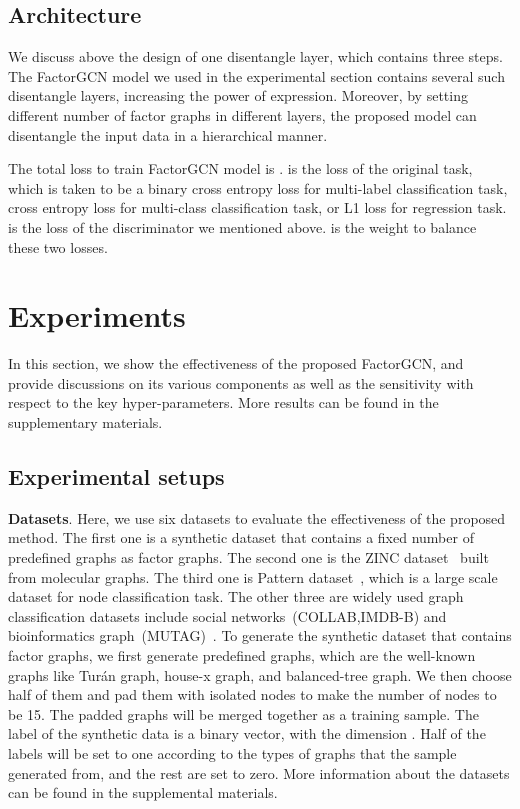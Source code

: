 \documentclass{article}
\begin{document}
\subsection{Architecture}

We discuss above the design of one disentangle layer, 
which contains three steps. The FactorGCN model 
we used in the experimental section contains
several such disentangle layers, increasing
the power of expression. Moreover, by setting different
number of factor graphs in different layers, 
the proposed model can disentangle the input data
in a hierarchical manner.

The total loss to train FactorGCN model is .  is the loss of
the original task, which is taken to be 
a binary cross entropy loss for multi-label
classification task, cross entropy loss for
multi-class classification task, or L1 loss for regression task.
 is the loss 
of the discriminator we mentioned above.  is the 
weight to balance these two losses.

\section{Experiments}

In this section, 
we show the effectiveness of the proposed FactorGCN,
and provide discussions
on its various components as well as 
the sensitivity with respect to the
key hyper-parameters.
More results can be found in the supplementary materials. 

\subsection{Experimental setups}

{\textbf{Datasets}. }
Here, we use six datasets to evaluate the 
effectiveness of the proposed method.
The first one is a synthetic dataset 
that contains a fixed number of predefined graphs
as factor graphs. The second one is the ZINC dataset~\citep{dwivedi2020benchmarkinggnn} 
built from molecular graphs.
The third one is Pattern dataset~\citep{dwivedi2020benchmarkinggnn},
which is a large scale dataset for node classification task.
The other three are widely used graph classification datasets
include social networks~(COLLAB,IMDB-B) 
and bioinformatics graph~(MUTAG)~\citep{yanardag2015deepgin}.
To generate the synthetic dataset that contains  factor graphs,
we first generate  predefined graphs, 
which are the well-known graphs like Tur\'an graph, house-x graph, 
and balanced-tree graph. 
We then choose half of them and pad them with isolated nodes to 
make the number of nodes to be 15.
The padded graphs will be merged together as a training sample.
The label of the synthetic data is a binary vector, with the dimension .
Half of the labels will be set to one according to
the types of graphs that the sample generated from, and
the rest are set to zero.
More information about the datasets can be found
in the supplemental materials.
\end{document}
